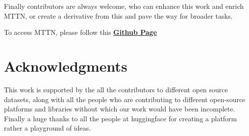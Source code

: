 \documentclass{article}
\begin{document}
Finally contributors are always welcome, who can enhance this work and enrich MTTN, or create a derivative from this and pave the way for broader tasks.

To access MTTN, please follow this \underline{\textbf{\href{https://github.com/mttn2023/mttn}{Github Page}} }

\section*{Acknowledgments}
This work is supported by the all the contributors to different open source datasets, along with all the people who are contributing to different open-source platforms and libraries without which our work would have been incomplete.
Finally a huge thanks to all the people at huggingface\cite{wolf-etal-2020-transformers} for creating a platform rather a playground of ideas.
\\

  
  
\end{document}
